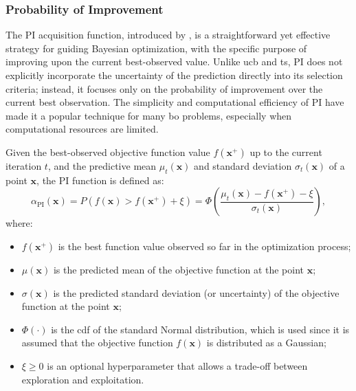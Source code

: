 \subsubsection{Probability of Improvement}
\label{section:pi}

The \ac{PI} acquisition function, introduced by \citet{kushner1964new}, is a straightforward yet effective strategy for guiding Bayesian optimization, with the specific purpose of improving upon the current best-observed value. Unlike \ac{ucb} and \ac{ts}, \ac{PI} does not explicitly incorporate the uncertainty of the prediction directly into its selection criteria; instead, it focuses only on the probability of improvement over the current best observation. The simplicity and computational efficiency of \ac{PI} have made it a popular technique for many \ac{bo} problems, especially when computational resources are limited.

Given the best-observed objective function value \(f(\mathbf{x}^+)\) up to the current iteration $t$, and the predictive mean \(\mu_t(\mathbf{x})\) and standard deviation \(\sigma_t(\mathbf{x})\) of a point \(\mathbf{x}\), the \ac{PI} function is defined as:
\begin{equation*}
\alpha_{\text{PI}}(\mathbf{x}) = P(f(\mathbf{x}) > f(\mathbf{x}^+) + \xi) = \Phi\left( \frac{\mu_t(\mathbf{x}) - f(\mathbf{x}^+) - \xi}{\sigma_t(\mathbf{x})} \right),
\label{eq:pi_formula}
\end{equation*}
where:
\begin{itemize}
    \item \(f(\mathbf{x}^+)\) is the best function value observed so far in the optimization process;
    \item \(\mu(\mathbf{x})\) is the predicted mean of the objective function at the point \(\mathbf{x}\);
    \item \(\sigma(\mathbf{x})\) is the predicted standard deviation (or uncertainty) of the objective function at the point \(\mathbf{x}\);
    \item \(\Phi(\cdot)\) is the \ac{cdf} of the standard Normal distribution, which is used since it is assumed that the objective function \(f(\mathbf{x})\) is distributed as a Gaussian;
    \item \(\xi \geq 0\) is an optional hyperparameter that allows a trade-off between exploration and exploitation. 
\end{itemize}

